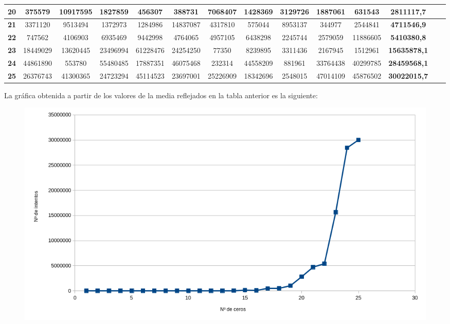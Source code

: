 \documentclass[10pt,a4paper,spanish]{report}
\begin{document}
\begin{table}[h!]
\begin{adjustbox}{max width=\textwidth}
\begin{tabular}{*{14}{|c}|}
   \textbf{20}                     & 375579     & 10917595   & 1827859    & 456307     & 388731     & 7068407    & 1428369    & 3129726    & 1887061    & 631543      & \textbf{2811117,7}  \\ \hline
   \textbf{21}                     & 3371120    & 9513494    & 1372973    & 1284986    & 14837087   & 4317810    & 575044     & 8953137    & 344977     & 2544841     & \textbf{4711546,9}  \\ \hline
   \textbf{22}                     & 747562     & 4106903    & 6935469    & 9442998    & 4764065    & 4957105    & 6438298    & 2245744    & 2579059    & 11886605    & \textbf{5410380,8}  \\ \hline
   \textbf{23}                     & 18449029   & 13620445   & 23496994   & 61228476   & 24254250   & 77350      & 8239895    & 3311436    & 2167945    & 1512961     & \textbf{15635878,1} \\ \hline
   \textbf{24}                     & 44861890   & 553780     & 55480485   & 17887351   & 46075468   & 232314     & 44558209   & 881961     & 33764438   & 40299785    & \textbf{28459568,1} \\ \hline
   \textbf{25}                     & 26376743   & 41300365   & 24723294   & 45114523   & 23697001   & 25226909   & 18342696   & 2548015    & 47014109   & 45876502    & \textbf{30022015,7} \\ \hline
  \end{tabular}
 \end{adjustbox}
\end{table}

\noindent
La gráfica obtenida a partir de los valores de la media reflejados en la tabla anterior es la siguiente:

\begin{figure}[!hbp]
 \centering  \includegraphics[width=1\textwidth]{./Imagenes/grafica_1.png}
\end{figure}
\end{document}
